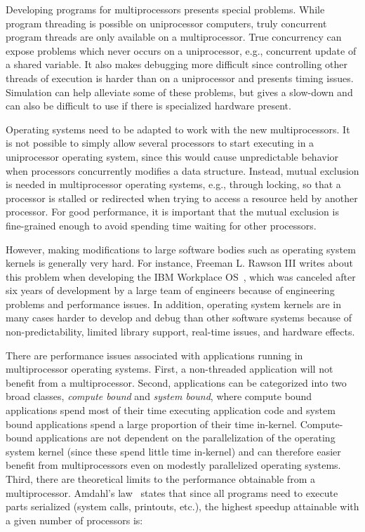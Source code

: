 
Developing programs for multiprocessors presents special problems. While
program threading is possible on uniprocessor computers, truly concurrent
program threads are only available on a multiprocessor. True concurrency can
expose problems which never occurs on a uniprocessor, e.g., concurrent update
of a shared variable. It also makes debugging more difficult since controlling
other threads of execution is harder than on a uniprocessor and presents
timing issues. Simulation can help alleviate some of these problems, but gives
a slow-down and can also be difficult to use if there is specialized hardware
present.

Operating systems need to be adapted to work with the new multiprocessors. It
is not possible to simply allow several processors to start executing in a
uniprocessor operating system, since this would cause unpredictable behavior
when processors concurrently modifies a data structure. Instead, mutual
exclusion is needed in multiprocessor operating systems, e.g., through locking,
so that a processor is stalled or redirected when trying to access a resource
held by another processor.  For good performance, it is important that the
mutual exclusion is fine-grained enough to avoid spending time waiting for
other processors.

However, making modifications to large software bodies such as operating
system kernels is generally very hard.  For instance, Freeman L. Rawson III
writes about this problem when developing the IBM Workplace
OS~\cite{rawson97experience}, which was canceled after six years of
development by a large team of engineers because of engineering problems and
performance issues. In addition, operating system kernels are in many cases
harder to develop and debug than other software systems because of
non-predictability, limited library support, real-time issues, and hardware
effects.

There are performance issues associated with applications running in
multiprocessor operating systems. First, a non-threaded application will not
benefit from a multiprocessor. Second, applications can be categorized into
two broad classes, \emph{compute bound} and \emph{system bound}, where compute
bound applications spend most of their time executing application code and
system bound applications spend a large proportion of their time in-kernel.
Compute-bound applications are not dependent on the parallelization of the
operating system kernel (since these spend little time in-kernel) and can
therefore easier benefit from multiprocessors even on modestly parallelized
operating systems. Third, there are theoretical limits to the performance
obtainable from a multiprocessor. Amdahl's law~\cite{amdahl67validity} states
that since all programs need to execute parts serialized (system calls,
printouts, etc.), the highest speedup attainable with a given number of
processors is:

